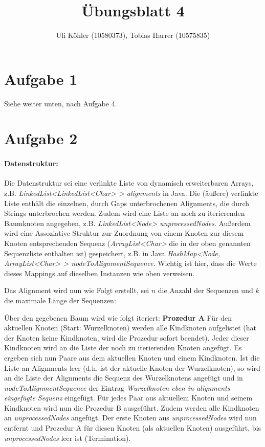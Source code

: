 \documentclass[a4paper,10pt,oneside,reqno]{scrartcl}
\title{Übungsblatt 4}
\author{Uli Köhler (10580373), Tobias Harrer (10575835)}
\begin{document}
\maketitle
\section*{Aufgabe 1}%
Siehe weiter unten, nach Aufgabe 4.

\section*{Aufgabe 2}%
\paragraph{Datenstruktur:}
Die Datenstruktur sei eine verlinkte Liste von dynamisch erweiterbaren Arrays, z.B. \textit{LinkedList<LinkedList<Char> > alignments} in Java.
Die (äußere) verlinkte Liste enthält die einzelnen, durch Gaps unterbrochenen Alignments, die durch Strings unterbrochen werden. Zudem wird eine Liste an noch zu iterierenden Baumknoten angegeben, z.B. \textit{LinkedList<Node> unprocessedNodes}. Außerdem wird eine Assoziative Struktur zur Zuordnung von einem Knoten zur diesem Knoten entsprechenden Sequenz (\textit{ArrayList<Char>} die in der oben genannten Sequenzliste enthalten ist) gespeichert, z.B. in Java \textit{HashMap<Node, ArrayList<Char> > nodeToAlignmentSequence}. Wichtig ist hier, dass die Werte dieses Mappings auf dieselben Instanzen wie oben verweisen.

Das Alignment wird nun wie Folgt erstellt, sei $n$ die Anzahl der Sequenzen und $k$ die maximale Länge der Sequenzen: 

Über den gegebenen Baum wird wie folgt iteriert:
\textbf{Prozedur A} Für den aktuellen Knoten (Start: Wurzelknoten) werden alle Kindknoten aufgelistet (hat der Knoten keine Kindknoten, wird die Prozedur sofort beendet). Jeder dieser Kindknoten wird an die Liste der noch zu iterierenden Knoten angefügt. Es ergeben sich nun Paare aus dem aktuellen Knoten und einem Kindknoten. Ist die Liste an Alignments leer (d.h. ist der aktuelle Knoten der Wurzelknoten), so wird an die Liste der Alignments die Sequenz des Wurzelknotens angefügt und in \textit{nodeToAlignmentSequence} der Eintrag \textit{Wurzelknoten \textrightarrow eben in alignments eingefügte Sequenz} eingefügt. Für jedes Paar aus aktuellem Knoten und seinem Kindknoten wird nun die Prozedur B ausgeführt. Zudem werden alle Kindknoten an \textit{unprocessedNodes} angefügt. Der erste Knoten aus \textit{unprocessedNodes} wird nun entfernt und Prozedur A für diesen Knoten (als aktuellen Knoten) ausgeführt, bis \textit{unprocessedNodes} leer ist (\textrightarrow Termination).\\[5mm]
\end{document}
